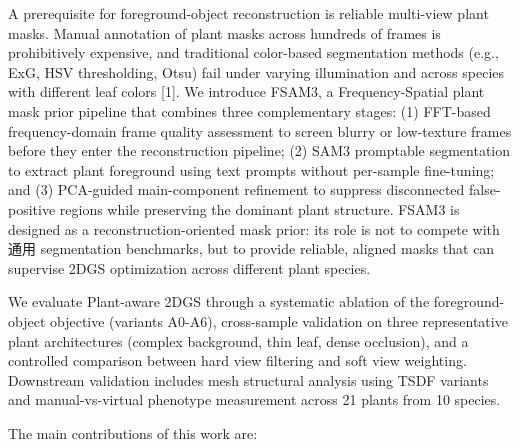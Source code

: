 \documentclass[11pt,a4paper]{article}
\begin{document}
A prerequisite for foreground-object reconstruction is reliable
multi-view plant masks. Manual annotation of plant masks across hundreds
of frames is prohibitively expensive, and traditional color-based
segmentation methods (e.g., ExG, HSV thresholding, Otsu) fail under
varying illumination and across species with different leaf colors
{[}1{]}. We introduce FSAM3, a Frequency-Spatial plant mask prior
pipeline that combines three complementary stages: (1) FFT-based
frequency-domain frame quality assessment to screen blurry or
low-texture frames before they enter the reconstruction pipeline; (2)
SAM3 promptable segmentation to extract plant foreground using text
prompts without per-sample fine-tuning; and (3) PCA-guided
main-component refinement to suppress disconnected false-positive
regions while preserving the dominant plant structure. FSAM3 is designed
as a reconstruction-oriented mask prior: its role is not to compete
with通用 segmentation benchmarks, but to provide reliable, aligned masks
that can supervise 2DGS optimization across different plant species.

We evaluate Plant-aware 2DGS through a systematic ablation of the
foreground-object objective (variants A0-A6), cross-sample validation on
three representative plant architectures (complex background, thin leaf,
dense occlusion), and a controlled comparison between hard view
filtering and soft view weighting. Downstream validation includes mesh
structural analysis using TSDF variants and manual-vs-virtual phenotype
measurement across 21 plants from 10 species.

The main contributions of this work are:
\end{document}
